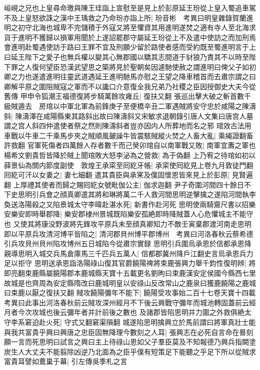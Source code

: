 峘峴之兄也上皇尋命璬與陳王珪詣上宣慰至是見上於彭原延王玢從上皇入蜀追車駕不及上皇怒欲誅之漢中王瑀救之乃命玢亦詣上所|{
	玢音彬　考異曰明皇雜錄賀蘭進明之初守北海也城卑不完儲積于外寇又將至懼資其用進明遂焚之適有寺人至北海求貨于進明不獲歸以損軍用聞於上遂詔罷郡守屬延王玢從上不及遣中使訪之而加刑焉會進明赴蜀遇使訪于路曰王罪不宜及刑願少留於路使者感而受約既至蜀進明言于上曰延王陛下之愛子也無兵權以變其心無郡國以驕其志間道于豺狼乃責其不以時至陛下罪之人復何望臣恐漢武望思之築將見於聖朝矣因遽馳使赦之謂進明曰俾父子如初卿之力也遂遣進明往靈武道遇延王進明馳馬亦慰之王望之降車稽首而去肅宗謂之曰卿解平原之圍阻賊寇之軍而不以讒口介意復全我兄弟乃社稷之臣因授御史大夫今從舊傳}
甲申令狐潮王福德復將步騎萬餘攻雍丘|{
	復扶又翻}
張巡出擊大破之斬首數千級賊遁去　房琯以中軍北軍為前鋒庚子至便橋辛丑二軍遇賊將安守忠於咸陽之陳濤斜|{
	陳濤澤在咸陽縣東其路斜出故曰陳濤斜又宋敏求退朝錄引唐人文集曰唐宫人墓謂之宫人斜四仲遣使者祭之然則陳濤斜者豈亦因内人所葬地而名之邪}
琯效古法用車戰以牛車二千乘馬步夾之賊順風皷譟牛皆震駭賊縱火焚之人畜大亂|{
	乘䋲證翻畜許救翻}
官軍死傷者四萬餘人存者數千而己癸卯琯自以南軍戰又敗|{
	南軍宜夀之軍也}
楊希文劉貴哲皆降於賊上聞琯敗大怒李泌為之營救|{
	為于偽翻}
上乃宥之待琯如初以薛景仙為關内節度副使　敦煌王承寀至囘紇牙帳|{
	承寀使囘紇見上卷九月敦徒門翻}
囘紇可汗以女妻之|{
	妻七細翻}
遣其貴臣與承宷及僕固懷恩皆來見上於彭原|{
	見賢遍翻}
上厚禮其使者而歸之賜囘紇女號毗伽公主|{
	伽求迦翻}
尹子奇圍河間四十餘日不下史思明引兵會之顔真卿遣其將和琳將萬二千人救河間思明逆擊擒之遂陷河間執李奐送洛陽殺之又陷景城太守李暐赴湛水死|{
	新書作赴河死}
思明使兩騎齎尺書以招樂安樂安即時舉郡降|{
	樂安郡棣州景城既陷樂安孤絶即時降賊蓋人心危懼城主不能守也}
又使其將康没野波將先鋒攻平原兵未至顔真卿知力不敵壬寅棄郡渡河南走思明即以平原兵攻清河博平皆陷之|{
	清河郡貝州博平郡博州　考異曰河洛春秋云蔡希德引兵攻貝州貝州陷攻博州五日城陷今從肅宗實録}
思明引兵圍烏承恩於信都承恩降親導思明入城交兵馬倉庫馬三千匹兵五萬人|{
	信都郡冀州降戶江翻史言烏承恩兵力足以拒守}
思明送承恩詣洛陽祿山復其官爵饒陽禆將束鹿張興力舉千鈞性復明辨|{
	將即亮翻束鹿縣屬饒陽郡本鹿城縣天寶十五載更名劉昫曰束鹿漢安定侯國今縣西七里故城是也齊周為安定縣隋改曰鹿城明皇以安祿山反改常山之鹿泉曰獲鹿饒陽之鹿城曰束鹿以厭之復扶又翻}
賊攻饒陽彌年不能下|{
	饒陽受攻事始二百十七卷天寶十四載　考異曰此事出河洛春秋前云賊攻深州經月不下後云興戰守彌年而城池轉固蓋前云經月者今次攻城也後云彌年者并計前後之數也}
及諸郡皆陷思明并力圍之外救俱絶太守李系窘迫赴火死|{
	守式又翻窘渠隕翻}
城遂陷思明擒興立於馬前謂曰將軍真壯士能與我共富貴乎興曰興唐之忠臣固無降理今數刻之人耳|{
	張興志在必死自言命在晷刻}
願一言而死思明曰試言之興曰主上待祿山恩如父子羣臣莫及不知報德乃興兵指闕塗炭生人大丈夫不能翦除凶逆乃北面為之臣乎僕有短策足下能聽之乎足下所以從賊求富貴耳譬如鷰巢于幕|{
	引左傳吳季札之言}
